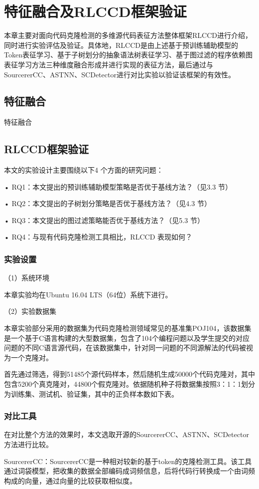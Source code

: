 \chapter{特征融合及RLCCD框架验证}
\label{chap:fusion}
本章主要对面向代码克隆检测的多维源代码表征方法整体框架RLCCD进行介绍，同时进行实验评估及验证。具体地，RLCCD是由上述基于预训练辅助模型的Token表征学习、基于子树划分的抽象语法树表征学习、基于图过滤的程序依赖图表征学习方法三种维度融合形成并进行实现的表征方法，最后通过与SourcererCC、ASTNN、SCDetector进行对比实验以验证该框架的有效性。
\section{特征融合}
特征融合
\section{RLCCD框架验证}
本文的实验设计主要围绕以下4 个方面的研究问题：

• RQ1：本文提出的预训练辅助模型策略是否优于基线方法？（见3.3 节）

• RQ2：本文提出的子树划分策略是否优于基线方法？（见4.3 节）

• RQ3：本文提出的图过滤策略能否优于基线方法？（见5.3 节）

• RQ4：与现有代码克隆检测工具相比，RLCCD 表现如何？

\subsection{实验设置}
（1）系统环境

本章实验均在Ubuntu 16.04 LTS（64位）系统下进行。


（2）实验数据集

本章实验部分采用的数据集为代码克隆检测领域常见的基准集POJ104，该数据集是一个基于C语言构建的大型数据集，包含了104个编程问题以及学生提交的对应问题的不同C语言源代码，在该数据集中，针对同一问题的不同源解法的代码被视为一个克隆对。

首先通过筛选，得到51485个源代码样本，然后随机生成50000个代码克隆对，其中包含5200个真克隆对，44800个假克隆对。依据随机种子将数据集按照3：1：1划分为训练集、测试机、验证集，其中的正负样本数如下表。


\subsection{对比工具}
在对比整个方法的效果时，本文选取开源的SourcererCC、ASTNN、SCDetector方法进行比较。

SourcererCC：SourcererCC是一种相对较新的基于token的克隆检测工具。该工具通过词袋模型，把收集的数据全部编码成词频信息，后将代码行转换成一个由词频构成的向量，通过向量的比较获取相似度。

